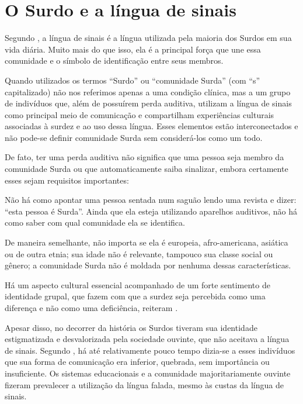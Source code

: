 \section{O Surdo e a língua de sinais}
\label{sec:lingua-sinais}

Segundo , a língua de sinais é a língua utilizada pela maioria dos Surdos em sua vida diária. Muito mais do que isso, ela é a principal força que une essa comunidade e o símbolo de identificação entre seus membros.


Quando utilizados os termos ``Surdo'' ou ``comunidade Surda'' (com ``s'' capitalizado) não nos referimos apenas a uma condição clínica, mas a um grupo de indivíduos que, além de possuírem perda auditiva, utilizam a língua de sinais como principal meio de comunicação e compartilham experiências culturais associadas à surdez e ao uso dessa língua. Esses elementos estão interconectados e não pode-se definir comunidade Surda sem considerá-los como um todo.

De fato, ter uma perda auditiva não significa que uma pessoa seja membro da comunidade Surda ou que automaticamente saiba sinalizar, embora certamente esses sejam requisitos importantes:


\begin{citacao}
    Não há como apontar uma pessoa sentada num saguão lendo uma revista e dizer: ``esta pessoa é Surda''. Ainda que ela esteja utilizando aparelhos auditivos, não há como saber com qual comunidade ela se identifica.

    De maneira semelhante, não importa se ela é europeia, afro-americana, asiática ou de outra etnia; sua idade não é relevante, tampouco sua classe social ou gênero; a comunidade Surda não é moldada por nenhuma dessas características.~\cite[tradução nossa]{stewart-2021-barrons-asl}

\end{citacao}


Há um aspecto cultural essencial acompanhado de um forte sentimento de identidade grupal, que fazem com que a surdez seja percebida como uma diferença e não como uma deficiência, reiteram .


Apesar disso, no decorrer da história os Surdos tiveram sua identidade estigmatizada e desvalorizada pela sociedade ouvinte, que não aceitava a língua de sinais. Segundo , há até relativamente pouco tempo dizia-se a esses indivíduos que sua forma de comunicação era inferior, quebrada, sem importância ou insuficiente. Os sistemas educacionais e a comunidade majoritariamente ouvinte fizeram prevalecer a utilização da língua falada, mesmo às custas da língua de sinais.

